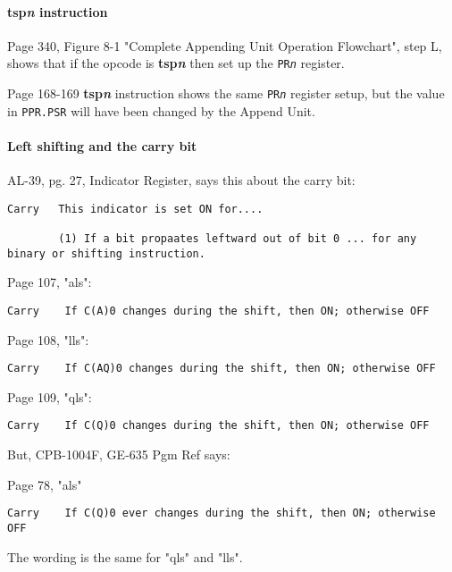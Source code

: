 \documentclass[notitlepage]{report}
\begin{document}
\paragraph{\textbf{tsp\textit{n}} instruction}

Page 340, Figure 8-1 "Complete Appending Unit Operation Flowchart", step L, shows that if the opcode
is \textbf{tsp\emph{n}} then set up the \texttt{PR\emph{n}} register.

Page 168-169 \textbf{tsp\textit{n}} instruction shows the same \texttt{PR\emph{n}} register setup, but the value in \texttt{PPR.PSR} will have been changed by the Append Unit.

\paragraph{Left shifting and the carry bit}

AL-39, pg. 27, Indicator Register, says this about the carry bit:

\begin{verbatim}
Carry   This indicator is set ON for....

        (1) If a bit propaates leftward out of bit 0 ... for any binary or shifting instruction.
\end{verbatim}

Page 107, "als":

\begin{verbatim}
Carry    If C(A)0 changes during the shift, then ON; otherwise OFF
\end{verbatim}

Page 108, "lls":

\begin{verbatim}
Carry    If C(AQ)0 changes during the shift, then ON; otherwise OFF
\end{verbatim}

Page 109, "qls":

\begin{verbatim}
Carry    If C(Q)0 changes during the shift, then ON; otherwise OFF
\end{verbatim}

But, CPB-1004F, GE-635 Pgm Ref says:

Page 78, "als"

\begin{verbatim}
Carry    If C(Q)0 ever changes during the shift, then ON; otherwise OFF
\end{verbatim}

The wording is the same for "qls" and "lls".
\end{document}
